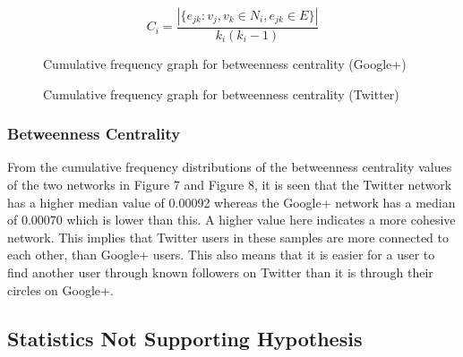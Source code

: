 \documentclass[a4paper, 10pt, conference]{ieeeconf}      %
\begin{document}
\[
C_i = \frac{|\{e_{jk}:v_j,v_k \in N_i,e_{jk} \in E\}|}{k_i(k_i-1)}
\]

\begin{figure}[thpb]
      \centering
      \caption{Cumulative frequency graph for betweenness centrality (Google+)}
      \label{figurelabel}
   \end{figure}
   
\begin{figure}[thpb]
      \centering
      \caption{Cumulative frequency graph for betweenness centrality (Twitter)}
      \label{figurelabel}
   \end{figure}
   
\subsubsection{Betweenness Centrality}
From the cumulative frequency distributions of the betweenness centrality values of the two networks in Figure 7 and Figure 8, it is seen that the Twitter network has a higher median value of 0.00092 whereas the Google+ network has a median of 0.00070 which is lower than this. A higher value here indicates a more cohesive network. This implies that Twitter users in these samples are more connected to each other, than Google+ users. This also means that it is easier for a user to find another user through known followers on Twitter than it is through their circles on Google+.

\subsection{Statistics Not Supporting Hypothesis}
\end{document}
